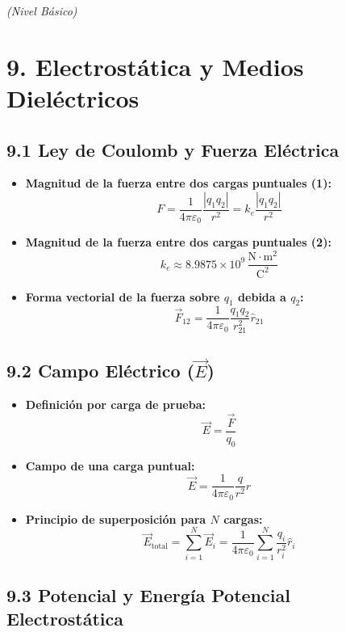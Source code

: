 \documentclass[11pt,a4paper]{article}
\begin{document}
\textit{(Nivel Básico)}

\section*{9. Electrostática y Medios Dieléctricos}

\subsection*{9.1 Ley de Coulomb y Fuerza Eléctrica}

\begin{itemize}
  \item \textbf{Magnitud de la fuerza entre dos cargas puntuales (1):}
  \[
    F = \frac{1}{4\pi\varepsilon_0} \frac{|q_1 q_2|}{r^2} = k_e \frac{|q_1 q_2|}{r^2}
  \]
  \item \textbf{Magnitud de la fuerza entre dos cargas puntuales (2):}
  \[
    k_e \approx 8.9875 \times 10^9 \, \frac{\mathrm{N}\cdot\mathrm{m}^2}{\mathrm{C}^2}
  \]
  \item \textbf{Forma vectorial de la fuerza sobre $q_1$ debida a $q_2$:}
  \[
    \vec{F}_{12} = \frac{1}{4\pi\varepsilon_0} \frac{q_1 q_2}{r_{21}^2} \hat{r}_{21}
  \]
\end{itemize}

\subsection*{9.2 Campo Eléctrico ($\vec{E}$)}

\begin{itemize}
  \item \textbf{Definición por carga de prueba:}
  \[
    \vec{E} = \frac{\vec{F}}{q_0}
  \]
  \item \textbf{Campo de una carga puntual:}
  \[
    \vec{E} = \frac{1}{4\pi\varepsilon_0} \frac{q}{r^2} \hat{r}
  \]
  \item \textbf{Principio de superposición para $N$ cargas:}
  \[
    \vec{E}_{\text{total}} = \sum_{i=1}^N \vec{E}_i = \frac{1}{4\pi\varepsilon_0} \sum_{i=1}^N \frac{q_i}{r_i^2} \hat{r}_i
  \]
\end{itemize}

\subsection*{9.3 Potencial y Energía Potencial Electrostática}
\end{document}
